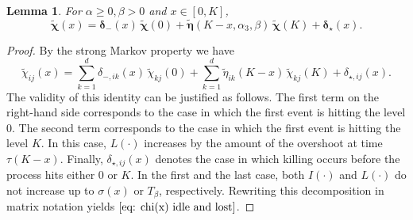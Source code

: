\documentclass[reqno,12pt]{amsart}
\newcommand{\bs}{\boldsymbol}
\newtheorem{lemma}{Lemma}
\begin{document}
{\begin{lemma}\label{lemma: decomp chi(x) idle and lost}
    For $\alpha \geqslant0, \beta>0$ and $x\in
    [0,K]$,
    \begin{equation}\label{eq: chi(x) idle and lost}
        \tilde{\bs \chi}(x) = \bs\delta_{-}(x)\,\tilde{\bs \chi}(0) + \tilde{\bs \eta}(K-x, \alpha_3, \beta)\,\tilde{\bs \chi}(K) + \bs\delta_{\star}(x).
    \end{equation}
\end{lemma}
\begin{proof}
By the strong Markov property we have
\begin{equation*}\label{eq: chi_ij(x) idle and lost}
\tilde\chi_{ij}(x) = \sum_{k=1}^d \delta_{-,ik}(x)\,\tilde\chi_{kj}(0) + \sum_{k=1}^d \tilde{\eta}_{ik}(K-x)\,\tilde\chi_{kj}(K) + \delta_{\star ,ij}(x).
\end{equation*}
The validity of this identity can be justified as follows.
The first term on the right-hand side corresponds to the case in which the first event is hitting the level $0$. The second term corresponds to the case in which the first event is hitting the level $K$. In this case, $L(\cdot)$ increases by the amount of the overshoot at time $\tau(K-x)$. Finally, $\delta_{\star ,ij}(x)$ denotes the case in which killing occurs before the process hits either $0$ or $K$. In the first and the last case, both $I(\cdot)$ and $L(\cdot)$ do not increase up to $\sigma(x)$ or $T_{\beta}$, respectively. Rewriting this decomposition in matrix notation yields $\eqref{eq: chi(x) idle and lost}$.
\end{proof}

}
\end{document}
